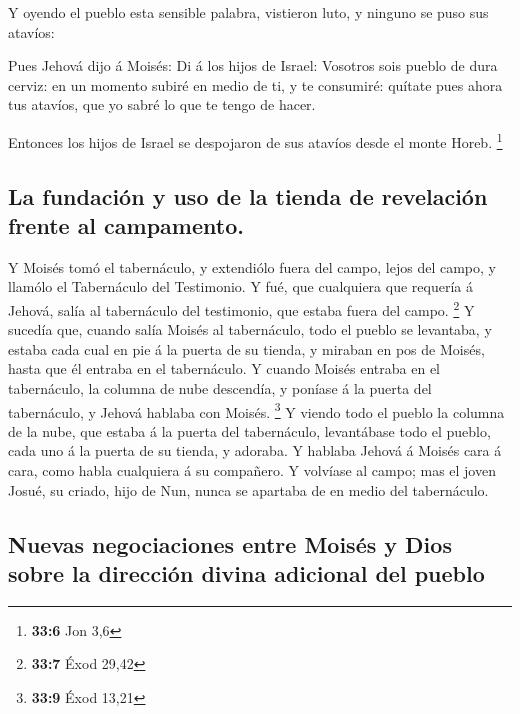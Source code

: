  Y oyendo el pueblo esta sensible palabra, vistieron luto, y
ninguno se puso sus atavíos:

 Pues Jehová dijo á Moisés: Di á los hijos de Israel:
Vosotros sois pueblo de dura cerviz: en un momento subiré en medio de
ti, y te consumiré: quítate pues ahora tus atavíos, que yo sabré lo que
te tengo de hacer.

 Entonces los hijos de Israel se despojaron de sus atavíos
desde el monte Horeb. \footnote{\textbf{33:6} Jon 3,6}

\hypertarget{la-fundaciuxf3n-y-uso-de-la-tienda-de-revelaciuxf3n-frente-al-campamento.}{%
\subsection{La fundación y uso de la tienda de revelación frente al
campamento.}\label{la-fundaciuxf3n-y-uso-de-la-tienda-de-revelaciuxf3n-frente-al-campamento.}}

 Y Moisés tomó el tabernáculo, y extendiólo fuera del campo,
lejos del campo, y llamólo el Tabernáculo del Testimonio. Y fué, que
cualquiera que requería á Jehová, salía al tabernáculo del testimonio,
que estaba fuera del campo. \footnote{\textbf{33:7} Éxod 29,42}
 Y sucedía que, cuando salía Moisés al tabernáculo, todo el
pueblo se levantaba, y estaba cada cual en pie á la puerta de su tienda,
y miraban en pos de Moisés, hasta que él entraba en el tabernáculo.
 Y cuando Moisés entraba en el tabernáculo, la columna de
nube descendía, y poníase á la puerta del tabernáculo, y Jehová hablaba
con Moisés. \footnote{\textbf{33:9} Éxod 13,21}  Y viendo
todo el pueblo la columna de la nube, que estaba á la puerta del
tabernáculo, levantábase todo el pueblo, cada uno á la puerta de su
tienda, y adoraba.  Y hablaba Jehová á Moisés cara á cara,
como habla cualquiera á su compañero. Y volvíase al campo; mas el joven
Josué, su criado, hijo de Nun, nunca se apartaba de en medio del
tabernáculo.

\hypertarget{nuevas-negociaciones-entre-moisuxe9s-y-dios-sobre-la-direcciuxf3n-divina-adicional-del-pueblo}{%
\subsection{Nuevas negociaciones entre Moisés y Dios sobre la dirección
divina adicional del
pueblo}\label{nuevas-negociaciones-entre-moisuxe9s-y-dios-sobre-la-direcciuxf3n-divina-adicional-del-pueblo}}

